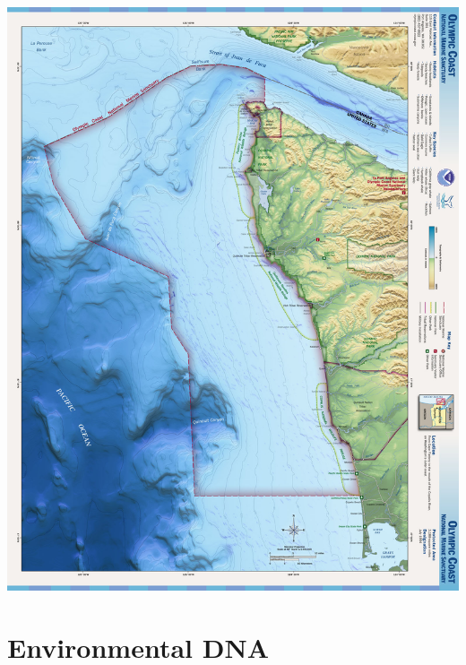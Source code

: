 \documentclass[12pt,twoside]{reedthesis}
\begin{document}
\includegraphics[scale = 0.5]{Fig_OCNMS_Map}
	
\section{Environmental DNA}
\end{document}
